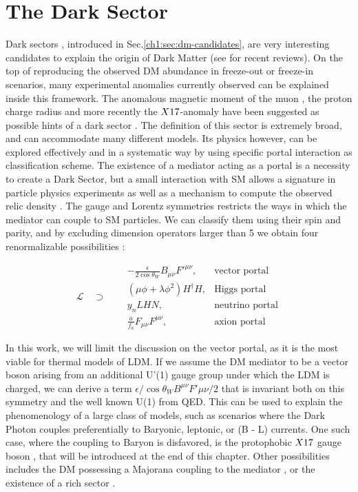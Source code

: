 \section{The Dark Sector}
\label{ch1:sec:dm-sector}

Dark sectors , introduced in Sec.\ref{ch1:sec:dm-candidates}, are very interesting candidates to explain the origin of Dark Matter (see \cite{battaglieri2017cosmic,alex2016dark} for recent reviews). On the top of reproducing the observed DM abundance in freeze-out or freeze-in scenarios, many experimental anomalies currently observed can be explained inside this framework. The anomalous magnetic moment of the muon \cite{blum2013muon}, the proton charge radius \cite{Pohl2010} and more recently the $X17$-anomaly \cite{Krasznahorkay:2015iga,Krasznahorkay:2019lyl} have been suggested as possible hints of a dark sector \cite{alex2016dark}. The definition of this sector is extremely broad, and can accommodate many different models. Its physics however, can be explored effectively and in a systematic way by using specific portal interaction as classification scheme.  The existence of a mediator acting as a portal is a necessity to create a Dark Sector, but a small interaction with SM allows a signature in particle physics experiments as well as a mechanism to compute the observed relic density \cite{prw, pospelov}. The gauge and Lorentz symmetries restricts the ways in which the mediator can couple to SM particles. We can classify them using their spin and parity, and by excluding dimension operators larger than 5 we obtain four renormalizable possibilities \cite{alex2016dark}:

\begin{equation}
  \label{eq:dm-portals}
  \mathcal{L} \quad \supset \quad
\begin{aligned}
  &-\frac{\epsilon}{2 \cos{\theta_W}}B_{\mu \nu}F'^{\mu \nu}, &\textrm{vector portal}\\
  & (\mu \phi + \lambda \phi^2)H^{\dagger}H, &\textrm{Higgs portal}\\
  &y_n LHN, &\textrm{neutrino portal} \\
  &\frac{a}{f_a} F_{\mu \nu} F^{\mu \nu}, &\textrm{axion portal}
\end{aligned}
\end{equation}

In this work, we will limit the discussion on the vector portal, as it is the most viable for thermal models of LDM. If we assume the DM mediator to be a vector boson arising from an additional U'(1) gauge group under which the LDM is charged, we can derive a term $\epsilon / \cos{\theta_W} B^{\mu \nu} F'{\mu \nu}/2$ that is invariant both on this symmetry and the well known U(1) from QED. This can be used to explain the phenomenology of a large class of models, such as scenarios where the Dark Photon couples preferentially to Baryonic, leptonic, or (B - L) currents. One such case, where the coupling to Baryon is disfavored, is the protophobic $X17$ gauge boson \cite{PhysRevD.95.035017}, that will be introduced at the end of this chapter. Other possibilities includes the DM possessing a Majorana coupling to the mediator \cite{PhysRevD.93.063523}, or the existence of a rich sector \cite{Morrissey_2014}.

